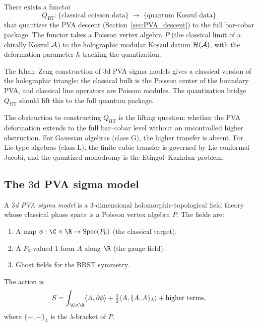 \begin{conjecture}
There exists a functor
\begin{equation}%
Q_{\mathrm{HT}}: \{\text{classical coisson data}\}
\;\longrightarrow\;
\{\text{quantum Koszul data}\}
\end{equation}
that quantizes the PVA descent (Section~\ref{sec:PVA_descent}) to the
full bar-cobar package. The functor takes a Poisson vertex algebra
$P$ (the classical limit of a chirally Koszul $\mathcal{A}$) to the holographic
modular Koszul datum $\mathcal{H}(\mathcal{A})$, with the deformation parameter
$\hbar$ tracking the quantization.
\end{conjecture}

\begin{remark}
The Khan--Zeng construction of 3d PVA sigma models gives a classical
version of the holographic triangle: the classical bulk is the Poisson
center of the boundary PVA, and classical line operators are Poisson
modules. The quantization bridge $Q_{\mathrm{HT}}$ should lift this
to the full quantum package.

The obstruction to constructing $Q_{\mathrm{HT}}$ is the lifting
question: whether the PVA deformation extends to the full bar--cobar
level without an uncontrolled higher obstruction. For Gaussian
algebras (class G), the higher transfer is absent. For Lie-type
algebras (class L), the finite cubic transfer is governed by Lie
conformal Jacobi, and the quantized monodromy is the
Etingof--Kazhdan problem.
\end{remark}


\subsection{The $3$d PVA sigma model}

\begin{definition}
A \emph{$3$d PVA sigma model} is a $3$-dimensional
holomorphic-topological field theory whose classical phase space
is a Poisson vertex algebra $P$. The fields are:
\begin{enumerate}[label=\textup{(\roman*)}]
\item A map $\phi: \C \times \R \to \Spec(P_0)$ (the classical
 target).
\item A $P_0$-valued $1$-form $A$ along $\R$ (the gauge field).
\item Ghost fields for the BRST symmetry.
\end{enumerate}
The action is
\begin{equation}%
S = \int_{\C \times \R}
\langle A, \bar\partial\phi \rangle
+ \tfrac{1}{2}\langle A, \{A, A\}_\lambda \rangle
+ \text{higher terms},
\end{equation}
where $\{-,-\}_\lambda$ is the $\lambda$-bracket of $P$.
\end{definition}

